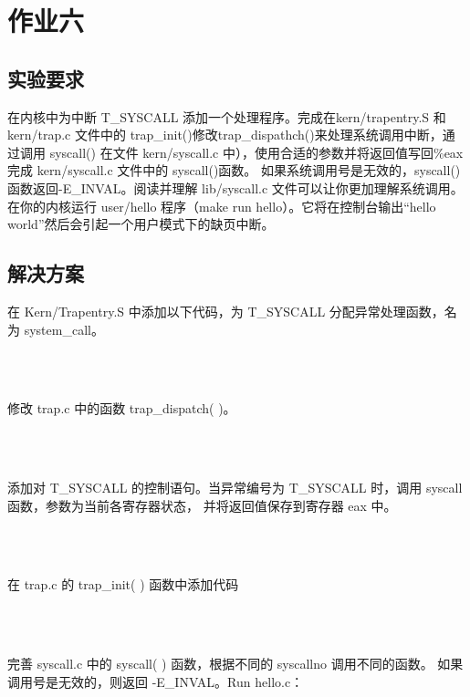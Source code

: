 \documentclass[12pt,a4paper,UTF8]{article}
\begin{document}
\section{作业六}
    \subsection{实验要求} 
在内核中为中断 T\_SYSCALL 添加一个处理程序。完成在kern/trapentry.S 和 kern/trap.c 文件中的
 trap\_init()修改trap\_dispathch()来处理系统调用中断，通过调用 syscall() 在文件 
kern/syscall.c 中），使用合适的参数并将返回值写回\%eax 完成 kern/syscall.c 文件中的 syscall()函数。
如果系统调用号是无效的，syscall()函数返回-E\_INVAL。阅读并理解 lib/syscall.c 文件可以让你更加理解系统调用。
在你的内核运行 user/hello 程序（make run hello）。它将在控制台输出“hello world”然后会引起一个用户模式下的缺页中断。 

    \subsection{解决方案}  
在 Kern/Trapentry.S 中添加以下代码，为 T\_SYSCALL 分配异常处理函数，名为 system\_call。

    \begin{lstlisting}[style=CPP]

        
    \end{lstlisting}

修改 trap.c 中的函数 trap\_dispatch( )。

    \begin{lstlisting}[style=CPP]

        
    \end{lstlisting}

    添加对 T\_SYSCALL 的控制语句。当异常编号为 T\_SYSCALL 时，调用 syscall 函数，参数为当前各寄存器状态，
    并将返回值保存到寄存器 eax 中。 

    \begin{lstlisting}[style=CPP]

        
    \end{lstlisting}

    在 trap.c 的 trap\_init( ) 函数中添加代码

    \begin{lstlisting}[style=CPP]

        
    \end{lstlisting}

    完善 syscall.c 中的 syscall( ) 函数，根据不同的 syscallno 调用不同的函数。
    如果调用号是无效的，则返回 -E\_INVAL。Run hello.c：
\end{document}
